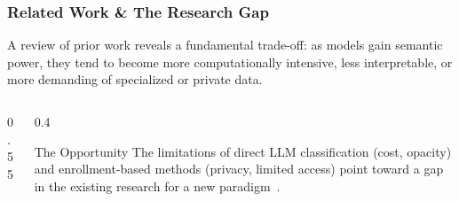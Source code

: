 \documentclass[aspectratio=169,10pt]{beamer}
\begin{document}
\begin{frame}
    \frametitle{Related Work \& The Research Gap}
    
    A review of prior work reveals a fundamental trade-off: as models gain semantic power, they tend to become more computationally intensive, less interpretable, or more demanding of specialized or private data.
    
    \begin{columns}[T]
        \begin{column}{0.55\textwidth}
        \end{column}

        \begin{column}{0.4\textwidth}
            \begin{alertblock}{The Opportunity}
                The limitations of direct LLM classification (cost, opacity) and enrollment-based methods (privacy, limited access) point toward a gap in the existing research for a new paradigm~\cite{pardos10.1145/3330430.3333622, slade10.1177/0002764213479366}.
                \vspace{1em}
                

\end{alertblock}
\end{column}
\end{columns}
\end{frame}
\end{document}
